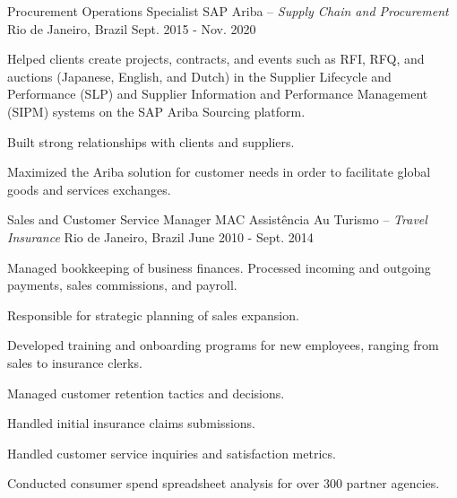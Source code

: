 


\begin{cventries}


\cventry
{Procurement Operations Specialist} %
{SAP Ariba \textmd{-- \em{Supply Chain and Procurement}}} %
{Rio de Janeiro, Brazil} %
{Sept. 2015 - Nov. 2020} %
{ %
\begin{cvitems}
\item {Helped clients create projects, contracts, and events such as RFI, RFQ, and auctions (Japanese, English, and Dutch)
in the Supplier Lifecycle and Performance (SLP) and Supplier Information and Performance Management (SIPM)
systems on the SAP Ariba Sourcing platform.}
\item {Built strong relationships with clients and suppliers.}
\item {Maximized the Ariba solution for customer needs in order to facilitate global goods and services exchanges.}
\end{cvitems}
}


\cventry
{Sales and Customer Service Manager} %
{MAC Assistência Au Turismo \textmd{-- \em{Travel Insurance}}} %
{Rio de Janeiro, Brazil} %
{June 2010 - Sept. 2014} %
{ %
\begin{cvitems}
\item {Managed bookkeeping of business finances. Processed incoming and outgoing payments, sales commissions, and payroll.}
\item {Responsible for strategic planning of sales expansion.}
\item {Developed training and onboarding programs for new employees, ranging from sales to insurance clerks.}
\item {Managed customer retention tactics and decisions.}
\item {Handled initial insurance claims submissions.}
\item {Handled customer service inquiries and satisfaction metrics.}
\item {Conducted consumer spend spreadsheet analysis for over 300 partner agencies.}
\end{cvitems}
}


\end{cventries}
